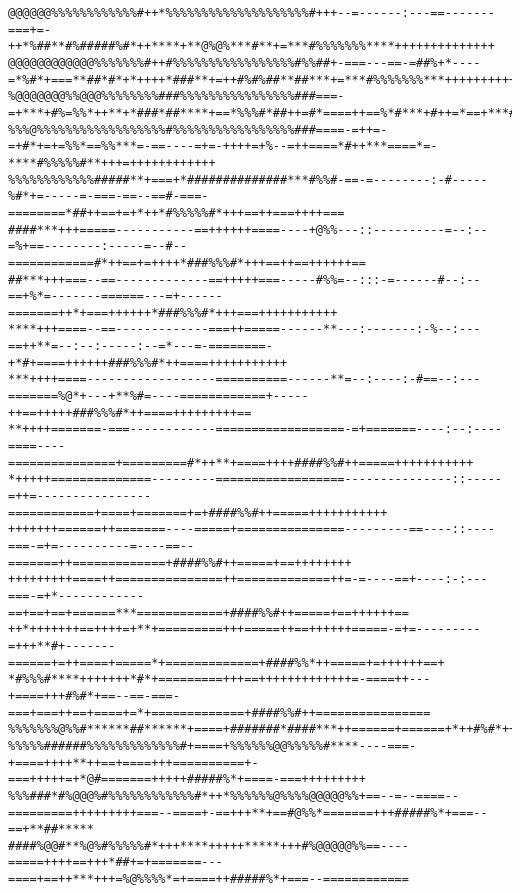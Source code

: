 \documentclass[a4paper, 12pt, oneside]{article}
\begin{document}
\begin{verbatim}
@@@@@@%%%%%%%%%%%%#++*%%%%%%%%%%%%%%%%%%%%#+++--=------:---==-------===+=-++*%##**#%#####%#*++****+**@%@%***#**+=***#%%%%%%%****++++++++++++++
@@@@@@@@@@@@%%%%%%%#++#%%%%%%%%%%%%%%%%%#%%##+-===---==-=##%+*----=*%#*+===**##*#*+*++++*###**+=++#%#%##**##***+=***#%%%%%%%***+++++++++++++++
%@@@@@@@%%@@@%%%%%%%%###%%%%%%%%%%%%%%%%###===-=+***+#%=%%*++**+*###*##****+==*%%%#*##++=#*====++==%*#***+#++=*==+***#%%%%%#***++=++++++++++++
%%%@%%%%%%%%%%%%%%%%%%#%%%%%%%%%%%%%%%%%###====-=++=-=+#*+=+=%%*==%%***=-==----=+=-++++=+%--=++====*#++***====*=-****#%%%%%#**+++=++++++++++++
%%%%%%%%%%%%#####**+===+*##############***#%%#-==-=--------:-#-----%#*+=-----=-===-==--==#-===-========*##++==+=+*++*#%%%%%#*+++==++===++++===
####***+++=====-----------==++++++====----+@%%---::----------=--:--=%+==--------:-----=--#--============#*++==+=++++*###%%%#*+++==++==++++++==
##***+++===--==-------------==+++++===-----#%%=--:::-=------#--:--==+%*=-------======---=+------=======++*+===++++++*###%%%#*+++===+++++++++++
****+++====--==-------------===++=====------**---:-------:-%--:---==++**=--:--:-----:--=*---=-========-+*#+====++++++###%%%#*++====+++++++++++
***++++====------------------==========------**=--:----:-#==--:---=======%@*+---+**%#=----============+-----++==+++++###%%%#*++====+++++++++==
**++++=======-===------------==================-=+=======----:--:----====----===============+=========#*++**+====++++####%%#++=====+++++++++++
*+++++==============---------==================---------------::-----=++=----------------============+====+=======+=+####%%#++=====+++++++++++
+++++++======++=======----=====+===============---------==----::----===-=+=----------=----==--=======++=============+####%%#++=====+==++++++++
+++++++++====++===============++=============++=-=----==+----:-:---===-=+*------------==+==+==+======***============+####%%#++=====+==++++++==
++*+++++++==++++=+**+=========+++=====++==++++++=====-=+=---------=+++**#+-------======+=++====+=====*+=============+####%%*++=====+=++++++==+
*#%%%#****+++++++*#*+=========+++==+++++++++++++=-====++---+====+++#%#*+==--==-===-===+===++==+====+=*+=============+####%%#++================
%%%%%%%@%%#******##******+====+#######*####***++======+======+*++#%#*++===================+======+++=++===========+++#####%#++======+++++++===
%%%%%######%%%%%%%%%%%%%#+====+%%%%%%@@%%%%%#****----===-+====++++**++==+====+++==========+-===+++++=+*@#=======+++++#####%*+====-===+++++++++
%%%###*#%@@@%#%%%%%%%%%%%%#*++*%%%%%%@%%%%@@@@@%%+==--=--====--=========+++++++++===--====+-==+++**+==#@%%*=======+++#####%*+===--==+**##*****
####%@@#**%@%#%%%%%#*+++****+++++*****+++#%@@@@@%%==----=====++++==+++*##+=+=======---====+==++***+++=%@%%%%*=+====++#####%*+===--============

\end{verbatim}
\end{document}
